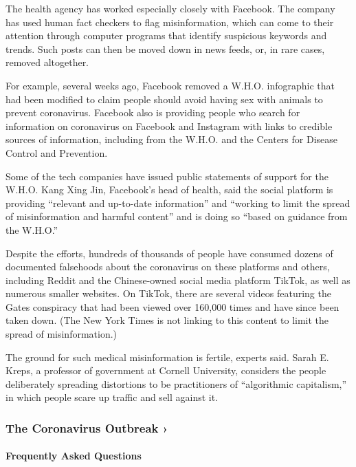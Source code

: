 The health agency has worked especially closely with Facebook. The
company has used human fact checkers to flag misinformation, which can
come to their attention through computer programs that identify
suspicious keywords and trends. Such posts can then be moved down in
news feeds, or, in rare cases, removed altogether.

For example, several weeks ago, Facebook removed a W.H.O. infographic
that had been modified to claim people should avoid having sex with
animals to prevent coronavirus. Facebook also is providing people who
search for information on coronavirus on Facebook and Instagram with
links to credible sources of information, including from the W.H.O. and
the Centers for Disease Control and Prevention.

Some of the tech companies have issued public statements of support for
the W.H.O. Kang Xing Jin, Facebook's head of health, said the social
platform is providing ``relevant and up-to-date information'' and
``working to limit the spread of misinformation and harmful content''
and is doing so ``based on guidance from the W.H.O.''

Despite the efforts, hundreds of thousands of people have consumed
dozens of documented falsehoods about the coronavirus on these platforms
and others, including Reddit and the Chinese-owned social media platform
TikTok, as well as numerous smaller websites. On TikTok, there are
several videos featuring the Gates conspiracy that had been viewed over
160,000 times and have since been taken down. (The New York Times is not
linking to this content to limit the spread of misinformation.)

The ground for such medical misinformation is fertile, experts said.
Sarah E. Kreps, a professor of government at Cornell University,
considers the people deliberately spreading distortions to be
practitioners of ``algorithmic capitalism,'' in which people scare up
traffic and sell against it.

\href{https://www.nytimes3xbfgragh.onion/news-event/coronavirus?action=click\&pgtype=Article\&state=default\&region=MAIN_CONTENT_3\&context=storylines_faq}{}

\hypertarget{the-coronavirus-outbreak-}{%
\subsubsection{The Coronavirus Outbreak
›}\label{the-coronavirus-outbreak-}}

\hypertarget{frequently-asked-questions}{%
\paragraph{Frequently Asked
Questions}\label{frequently-asked-questions}}


